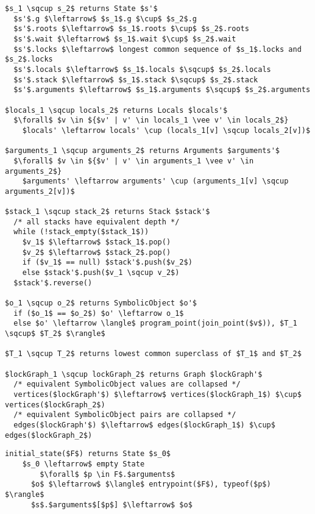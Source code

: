 \begin{lstlisting}[language=CSharp,mathescape,caption=Join function for state,label=fig:joinFunction,float]
$s_1 \sqcup s_2$ returns State $s'$
  $s'$.g $\leftarrow$ $s_1$.g $\cup$ $s_2$.g
  $s'$.roots $\leftarrow$ $s_1$.roots $\cup$ $s_2$.roots
  $s'$.wait $\leftarrow$ $s_1$.wait $\cup$ $s_2$.wait
  $s'$.locks $\leftarrow$ longest common sequence of $s_1$.locks and $s_2$.locks
  $s'$.locals $\leftarrow$ $s_1$.locals $\sqcup$ $s_2$.locals
  $s'$.stack $\leftarrow$ $s_1$.stack $\sqcup$ $s_2$.stack
  $s'$.arguments $\leftarrow$ $s_1$.arguments $\sqcup$ $s_2$.arguments
  
$locals_1 \sqcup locals_2$ returns Locals $locals'$
  $\forall$ $v \in ${$v' | v' \in locals_1 \vee v' \in locals_2$}
    $locals' \leftarrow locals' \cup (locals_1[v] \sqcup locals_2[v])$

$arguments_1 \sqcup arguments_2$ returns Arguments $arguments'$
  $\forall$ $v \in ${$v' | v' \in arguments_1 \vee v' \in arguments_2$}
    $arguments' \leftarrow arguments' \cup (arguments_1[v] \sqcup arguments_2[v])$

$stack_1 \sqcup stack_2$ returns Stack $stack'$
  /* all stacks have equivalent depth */
  while (!stack_empty($stack_1$))
    $v_1$ $\leftarrow$ $stack_1$.pop()
    $v_2$ $\leftarrow$ $stack_2$.pop()
    if ($v_1$ == null) $stack'$.push($v_2$)
    else $stack'$.push($v_1 \sqcup v_2$)
  $stack'$.reverse()

$o_1 \sqcup o_2$ returns SymbolicObject $o'$
  if ($o_1$ == $o_2$) $o' \leftarrow o_1$
  else $o' \leftarrow \langle$ program_point(join_point($v$)), $T_1 \sqcup$ $T_2$ $\rangle$
 
$T_1 \sqcup T_2$ returns lowest common superclass of $T_1$ and $T_2$

$lockGraph_1 \sqcup lockGraph_2$ returns Graph $lockGraph'$
  /* equivalent SymbolicObject values are collapsed */
  vertices($lockGraph'$) $\leftarrow$ vertices($lockGraph_1$) $\cup$ vertices($lockGraph_2$)
  /* equivalent SymbolicObject pairs are collapsed */
  edges($lockGraph'$) $\leftarrow$ edges($lockGraph_1$) $\cup$ edges($lockGraph_2$)

\end{lstlisting}

\begin{lstlisting}[language=CSharp,mathescape,caption=Initial symbolic state for method,label=fig:initialState,float]
initial_state($F$) returns State $s_0$
    $s_0 \leftarrow$ empty State
		$\forall$ $p \in F$.$arguments$
      $o$ $\leftarrow$ $\langle$ entrypoint($F$), typeof($p$) $\rangle$
      $s$.$arguments$[$p$] $\leftarrow$ $o$
\end{lstlisting}

